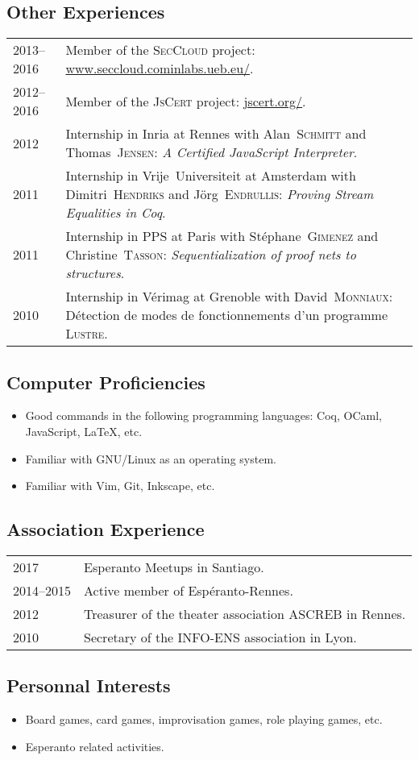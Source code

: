 \documentclass[12pt,a4paper]{article}
\makeatletter
\newcommand{\fr}[1]{\foreignlanguage{french}{{#1}}}
\newcommand{\fr}[1]{\foreignlanguage{francais}{{#1}}}
\newenvironment{datecvsection}[1]%
               {\subsection*{#1}%
                 \noindent \begin{tabular}{@{}p{\annee}p{\texte}@{}}}
               {\end{tabular}}
\newenvironment{itemcvsection}[1]%
               {\subsection*{#1}\begin{itemize}}
               {\end{itemize}}
\newcommand\familyName{\textsc}
\newcommand\placeName{}
\makeatother
\begin{document}
\begin{datecvsection}{Other Experiences}

	2013–2016 & Member of the \textsc{SecCloud} project:  \url{www.seccloud.cominlabs.ueb.eu/}. \\

	2012–2016 & Member of the \textsc{JsCert} project:  \url{jscert.org/}. \\

	2012 & Internship in \placeName{Inria} at \placeName{Rennes} with Alan~\familyName{Schmitt} and Thomas~\familyName{Jensen}:
	\textit{A Certified JavaScript Interpreter}. \\

	2011 & Internship in \placeName{Vrĳe~Universiteit} at \placeName{Amsterdam} with Dimitri~\familyName{Hendriks} and Jörg~\familyName{Endrullis}:
	\textit{Proving Stream Equalities in Coq}. \\

    2011 & Internship in \fr{\placeName{PPS}} at \placeName{Paris} with Stéphane~\familyName{Gimenez} and Christine~\familyName{Tasson}:
	\textit{Sequentialization of proof nets to structures}. \\

    2010 & Internship in \fr{\placeName{Vérimag}} at \placeName{Grenoble} with David~\familyName{Monniaux}:
        \fr{Détection de modes de fonctionnements d’un programme \textsc{Lustre}}. \\

\end{datecvsection}

\begin{itemcvsection}{Computer Proficiencies}

	\item Good commands in the following programming languages:  Coq, OCaml, JavaScript, \LaTeX, etc.
	\item Familiar with GNU/Linux as an operating system.
	\item Familiar with Vim, Git, Inkscape, etc.

\end{itemcvsection}

\begin{datecvsection}{Association Experience}

		2017 & Esperanto Meetups in \placeName{Santiago}. \\
		2014–2015 & Active member of {Espéranto-Rennes}. \\
		2012 & Treasurer of the theater association {ASCREB} in \placeName{Rennes}. \\
		2010 & Secretary of the \textsc{INFO-ENS} association in \placeName{Lyon}. \\

\end{datecvsection}

\begin{itemcvsection}{Personnal Interests}

		\item Board games, card games, improvisation games, role playing games, etc.
    \item Esperanto related activities.

\end{itemcvsection}
\end{document}
